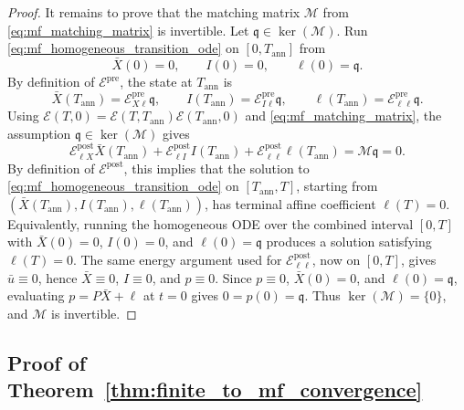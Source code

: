 \documentclass[12pt]{article}
\numberwithin{equation}{section}
\theoremstyle{definition}
\begin{document}
\begin{proof}
It remains to prove that the matching matrix \(\mathcal M\)
from \eqref{eq:mf_matching_matrix} is invertible.
Let \(\mathfrak q\in\ker(\mathcal M)\). Run
\eqref{eq:mf_homogeneous_transition_ode} on \([0,T_{\mathrm{ann}}]\) from
\[
\bar X(0)=0,
\qquad
I(0)=0,
\qquad
\ell(0)=\mathfrak q.
\]
By definition of \(\mathcal E^{\mathrm{pre}}\), the state at \(T_{\mathrm{ann}}\) is
\[
\bar X(T_{\mathrm{ann}})=\mathcal E^{\mathrm{pre}}_{X\ell}\mathfrak q,
\qquad
I(T_{\mathrm{ann}})=\mathcal E^{\mathrm{pre}}_{I\ell}\mathfrak q,
\qquad
\ell(T_{\mathrm{ann}})=\mathcal E^{\mathrm{pre}}_{\ell\ell}\mathfrak q.
\]
Using
\(\mathcal E(T,0)=\mathcal E(T,T_{\mathrm{ann}})
\mathcal E(T_{\mathrm{ann}},0)\) and
\eqref{eq:mf_matching_matrix}, the assumption
\(\mathfrak q\in\ker(\mathcal M)\) gives
\[
\mathcal E^{\mathrm{post}}_{\ell X}\bar X(T_{\mathrm{ann}})
+
\mathcal E^{\mathrm{post}}_{\ell I}I(T_{\mathrm{ann}})
+
\mathcal E^{\mathrm{post}}_{\ell\ell}\ell(T_{\mathrm{ann}})
=\mathcal M\mathfrak q
=0.
\]
By definition of \(\mathcal E^{\mathrm{post}}\), this implies that the solution to
\eqref{eq:mf_homogeneous_transition_ode} on
\([T_{\mathrm{ann}},T]\), starting from
\((\bar X(T_{\mathrm{ann}}),I(T_{\mathrm{ann}}),\ell(T_{\mathrm{ann}}))\), has terminal
affine coefficient \(\ell(T)=0\). Equivalently, running the homogeneous ODE over
the combined interval \([0,T]\) with \(\bar X(0)=0\), \(I(0)=0\), and
\(\ell(0)=\mathfrak q\)
produces a solution satisfying \(\ell(T)=0\). The same energy argument used for
\(\mathcal E^{\mathrm{post}}_{\ell\ell}\), now on \([0,T]\), gives
\(\bar u\equiv0\), hence \(\bar X\equiv0\), \(I\equiv0\), and
\(p\equiv0\).
Since \(p\equiv0\), \(\bar X(0)=0\), and \(\ell(0)=\mathfrak q\), evaluating
\(p=P\bar X+\ell\) at \(t=0\) gives
\(0=p(0)=\mathfrak q\). Thus
\(\ker(\mathcal M)=\{0\}\), and \(\mathcal M\) is invertible.
\end{proof}

\subsection{Proof of Theorem~\ref{thm:finite_to_mf_convergence}}
\label{subsec:proof_finite_to_mf_convergence}
\end{document}
